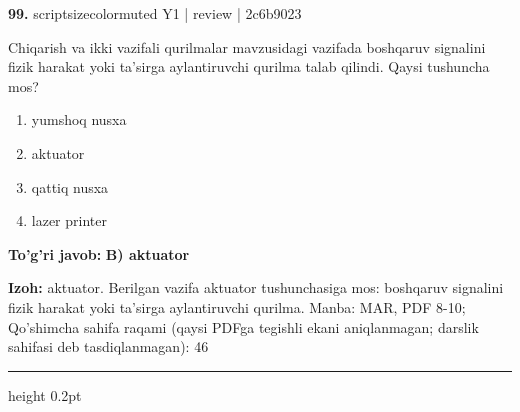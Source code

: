 \documentclass[10pt,a4paper]{article}
\begin{document}
{\bfseries\sffamily\color{ink} 99.} {scriptsizecolor{muted} Y1 | review | 2c6b9023}
\par
Chiqarish va ikki vazifali qurilmalar mavzusidagi vazifada boshqaruv signalini fizik harakat yoki ta'sirga aylantiruvchi qurilma talab qilindi. Qaysi tushuncha mos?
\begin{enumerate}[label=\Alph*),leftmargin=9mm]
\item yumshoq nusxa
\item aktuator
\item qattiq nusxa
\item lazer printer
\end{enumerate}
\begin{tcolorbox}[enhanced,breakable,colback=teal!4,colframe=teal!60!black,boxrule=0.45pt,arc=1.2mm,left=2.7mm,right=2.7mm,top=1.8mm,bottom=1.8mm,before skip=2mm,after skip=2mm]
{\bfseries\sffamily\color{teal}To'g'ri javob:} \textbf{B) aktuator}
\par\smallskip
{\bfseries Izoh:} aktuator. Berilgan vazifa aktuator tushunchasiga mos: boshqaruv signalini fizik harakat yoki ta'sirga aylantiruvchi qurilma. Manba: MAR, PDF 8-10; Qo'shimcha sahifa raqami (qaysi PDFga tegishli ekani aniqlanmagan; darslik sahifasi deb tasdiqlanmagan): 46
\end{tcolorbox}
\vspace{2mm}\hrule height 0.2pt\vspace{3mm}
\end{document}
